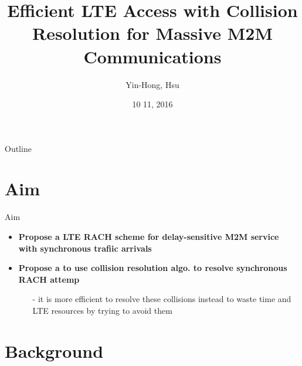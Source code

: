 \documentclass{beamer}
\title {
    Efficient LTE Access with Collision Resolution for Massive M2M Communications \cite{ELACR}
}
\author {
    Yin-Hong, Hsu
}
\date {
    10 11, 2016
}
\begin{document}
\begin{frame}
    \titlepage
\end{frame}


\begin{frame}{Outline}
    \tableofcontentsgather
    \tableofcontents
\end{frame}

\section{Aim}

\begin{frame} {Aim} 
    \begin{itemize}
        \item \textbf{Propose a LTE RACH scheme for delay-sensitive M2M service with synchronous trafiic arrivals}
        \item \textbf{Propose a to use collision resolution algo. to resolve synchronous RACH attemp}
        \begin{itemize}
            \item [-]{it is more efficient to resolve these collisions instead to waste time and LTE resources by trying to avoid them} 
        \end{itemize}
    \end{itemize}
\end{frame}

\section{Background}
\end{document}
